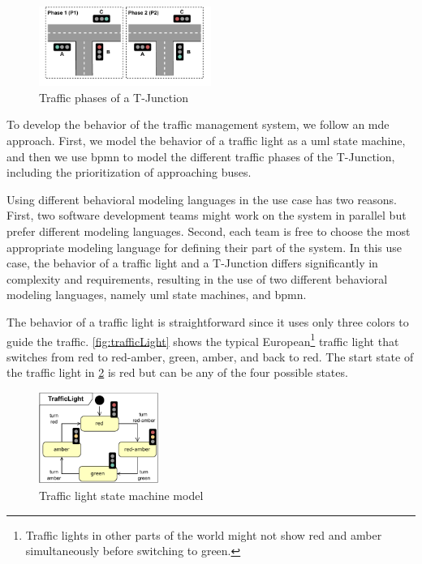 \documentclass{jot}
\begin{document}
\begin{figure}[h]
    \centering
    \includegraphics[width=0.5\textwidth]{figures/phases.pdf}
    \caption{Traffic phases of a T-Junction}
    \label{fig:junction-phases}
\end{figure}

To develop the behavior of the traffic management system, we follow an \gls*{mde} approach.
First, we model the behavior of a traffic light as a \gls*{uml} state machine, and then we use \gls*{bpmn} to model the different traffic phases of the T-Junction, including the prioritization of approaching buses.

Using different behavioral modeling languages in the use case has two reasons.
First, two software development teams might work on the system in parallel but prefer different modeling languages.
Second, each team is free to choose the most appropriate modeling language for defining their part of the system.
In this use case, the behavior of a traffic light and a T-Junction differs significantly in complexity and requirements, resulting in the use of two different behavioral modeling languages, namely \gls*{uml} state machines, and \gls*{bpmn}.

The behavior of a traffic light is straightforward since it uses only three colors to guide the traffic.
\autoref{fig:trafficLight} shows the typical European\footnote{Traffic lights in other parts of the world might not show red and amber simultaneously before switching to green.} traffic light that switches from \textsf{red} to \textsf{red-amber}, \textsf{green}, \textsf{amber}, and back to \textsf{red}.
The start state of the traffic light in \cref{fig:trafficLight} is \textsf{red} but can be any of the four possible states.

\begin{figure}[h]
    \centering
    \includegraphics[width=0.35\textwidth]{figures/trafficLight.pdf}
    \caption{Traffic light state machine model}
    \label{fig:trafficLight}
\end{figure}
\end{document}

